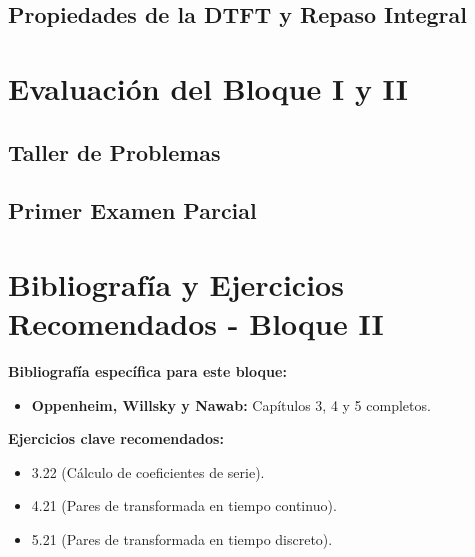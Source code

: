 \documentclass[11pt,a4paper,openany]{book}
\begin{document}
\section{Propiedades de la DTFT y Repaso Integral}



\chapter{Evaluación del Bloque I y II}

\section{Taller de Problemas}

\section{Primer Examen Parcial}



\cleardoublepage
{}
{}
\chapter*{Bibliografía y Ejercicios Recomendados - Bloque II}

\textbf{Bibliografía específica para este bloque:}
\begin{itemize}
	\item \textbf{Oppenheim, Willsky y Nawab:} Capítulos 3, 4 y 5 completos.
\end{itemize}

\textbf{Ejercicios clave recomendados:}
\begin{itemize}
	\item 3.22 (Cálculo de coeficientes de serie).
	\item 4.21 (Pares de transformada en tiempo continuo).
	\item 5.21 (Pares de transformada en tiempo discreto).
\end{itemize}
\end{document}

